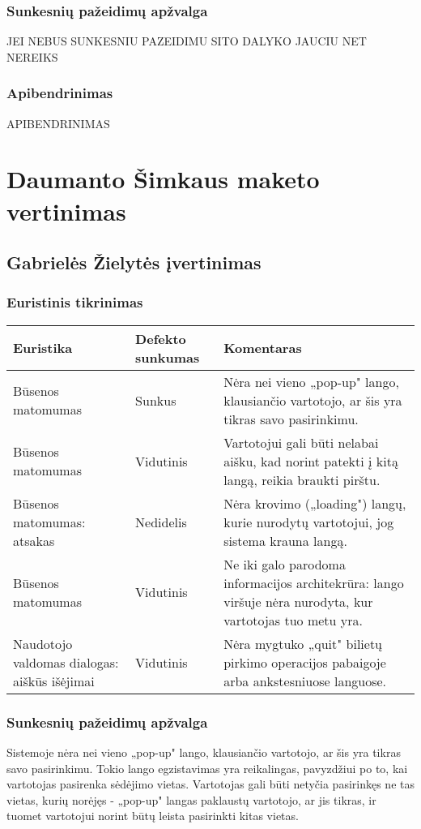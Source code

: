 \documentclass{VUMIFPSkursinis}
\begin{document}
\subsubsection{Sunkesnių pažeidimų apžvalga}
JEI NEBUS SUNKESNIU PAZEIDIMU SITO DALYKO JAUCIU NET NEREIKS

\subsubsection{Apibendrinimas}
APIBENDRINIMAS

\section{Daumanto Šimkaus maketo vertinimas}
\subsection{Gabrielės Žielytės įvertinimas}
\subsubsection{Euristinis tikrinimas}
\begin{center}
 \begin{tabular}{|| p{4cm} | p{4cm} | p{8cm} ||} 
 \hline
 Euristika & Defekto sunkumas & Komentaras \\
 \hline\hline
 Būsenos matomumas & Sunkus & Nėra nei vieno „pop-up" lango, klausiančio vartotojo, ar šis yra tikras savo pasirinkimu.\\ 
 \hline
 Būsenos matomumas & Vidutinis & Vartotojui gali būti nelabai aišku, kad norint patekti į kitą langą, reikia braukti pirštu.\\
 \hline
 Būsenos matomumas: atsakas & Nedidelis & Nėra krovimo („loading") langų, kurie nurodytų vartotojui, jog sistema krauna langą. \\
 \hline
 Būsenos matomumas & Vidutinis & Ne iki galo parodoma informacijos architekrūra: lango viršuje nėra nurodyta, kur vartotojas tuo metu yra. \\  
 \hline   
 Naudotojo valdomas dialogas: aiškūs išėjimai & Vidutinis & Nėra mygtuko „quit" bilietų pirkimo operacijos pabaigoje arba ankstesniuose languose. \\
 \hline              
\end{tabular}	
\end{center}

\subsubsection{Sunkesnių pažeidimų apžvalga}
Sistemoje nėra nei vieno „pop-up" lango, klausiančio vartotojo, ar šis yra tikras savo pasirinkimu. Tokio lango egzistavimas yra reikalingas, pavyzdžiui po to, kai vartotojas pasirenka sėdėjimo vietas. Vartotojas gali būti netyčia pasirinkęs ne tas vietas, kurių norėjęs - „pop-up" langas paklaustų vartotojo, ar jis tikras, ir tuomet vartotojui norint būtų leista pasirinkti kitas vietas.
\end{document}
